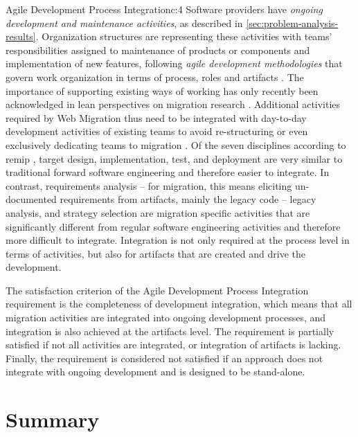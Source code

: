 \begin{thesisstakeholderrequirement}{Agile Development Process Integration}{c:4}
Software providers have \emph{ongoing development and maintenance activities}, as described in \cref{sec:problem-analysis-results}.
Organization structures are representing these activities with teams' responsibilities assigned to maintenance of products or components and implementation of new features, following \emph{agile development methodologies} that govern work organization in terms of process, roles and artifacts \autocite{Beedle2002Scrum}.
The importance of supporting existing ways of working has only recently been acknowledged in lean perspectives on migration research \autocite{Razavian2014a}.
Additional activities required by \gls{Web Migration} thus need to be integrated with day-to-day development activities of existing teams to avoid re-structuring or even exclusively dedicating teams to migration \autocites[cf.~\emph{modernization teams} in][]{Krasteva2013REMICSAgile}[\emph{migration factory teams} in][]{AmazonWebServices2018Migration}.
Of the seven disciplines according to \gls{remip} \autocite{Sneed2010ReMiP,Gipp2007ReMiP}, target design, implementation, test, and deployment are very similar to traditional forward software engineering and therefore easier to integrate.
In contrast, requirements analysis -- for migration, this means eliciting un-documented requirements from  \glspl{artifact}, mainly the legacy code -- legacy analysis, and strategy selection are migration specific activities that are significantly different from regular software engineering activities and therefore more difficult to integrate.
Integration is not only required at the process level in terms of activities, but also for \glspl{artifact} that are created and drive the development.

The satisfaction criterion of the Agile Development Process Integration requirement is the completeness of development integration, which means that all migration activities are integrated into ongoing development processes, and integration is also achieved at the \glspl{artifact} level.
The requirement is partially satisfied if not all activities are integrated, or integration of \glspl{artifact} is lacking.
Finally, the requirement is considered not satisfied if an approach does not integrate with ongoing development and is designed to be stand-alone.
\end{thesisstakeholderrequirement}

\vspace{-15pt}
\hypertarget{sec:requirements.summary}{%
\section{Summary}\label{sec:requirements.summary}}
\vspace{15pt}

